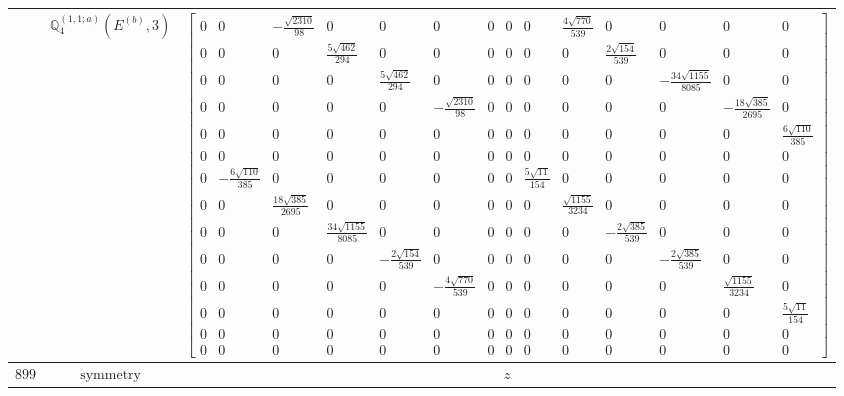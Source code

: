 \documentclass[fleqn,8pt,landscape]{jsarticle}
\begin{document}
\begin{longtable}{ccc}
$  $ & $ \mathbb{Q}_{4}^{(1,1;a)}(E^{(b)},3) $ & $ \begin{bmatrix} 0 & 0 & - \frac{\sqrt{2310}}{98} & 0 & 0 & 0 & 0 & 0 & 0 & \frac{4 \sqrt{770}}{539} & 0 & 0 & 0 & 0 \\ 0 & 0 & 0 & \frac{5 \sqrt{462}}{294} & 0 & 0 & 0 & 0 & 0 & 0 & \frac{2 \sqrt{154}}{539} & 0 & 0 & 0 \\ 0 & 0 & 0 & 0 & \frac{5 \sqrt{462}}{294} & 0 & 0 & 0 & 0 & 0 & 0 & - \frac{34 \sqrt{1155}}{8085} & 0 & 0 \\ 0 & 0 & 0 & 0 & 0 & - \frac{\sqrt{2310}}{98} & 0 & 0 & 0 & 0 & 0 & 0 & - \frac{18 \sqrt{385}}{2695} & 0 \\ 0 & 0 & 0 & 0 & 0 & 0 & 0 & 0 & 0 & 0 & 0 & 0 & 0 & \frac{6 \sqrt{110}}{385} \\ 0 & 0 & 0 & 0 & 0 & 0 & 0 & 0 & 0 & 0 & 0 & 0 & 0 & 0 \\ 0 & - \frac{6 \sqrt{110}}{385} & 0 & 0 & 0 & 0 & 0 & 0 & \frac{5 \sqrt{11}}{154} & 0 & 0 & 0 & 0 & 0 \\ 0 & 0 & \frac{18 \sqrt{385}}{2695} & 0 & 0 & 0 & 0 & 0 & 0 & \frac{\sqrt{1155}}{3234} & 0 & 0 & 0 & 0 \\ 0 & 0 & 0 & \frac{34 \sqrt{1155}}{8085} & 0 & 0 & 0 & 0 & 0 & 0 & - \frac{2 \sqrt{385}}{539} & 0 & 0 & 0 \\ 0 & 0 & 0 & 0 & - \frac{2 \sqrt{154}}{539} & 0 & 0 & 0 & 0 & 0 & 0 & - \frac{2 \sqrt{385}}{539} & 0 & 0 \\ 0 & 0 & 0 & 0 & 0 & - \frac{4 \sqrt{770}}{539} & 0 & 0 & 0 & 0 & 0 & 0 & \frac{\sqrt{1155}}{3234} & 0 \\ 0 & 0 & 0 & 0 & 0 & 0 & 0 & 0 & 0 & 0 & 0 & 0 & 0 & \frac{5 \sqrt{11}}{154} \\ 0 & 0 & 0 & 0 & 0 & 0 & 0 & 0 & 0 & 0 & 0 & 0 & 0 & 0 \\ 0 & 0 & 0 & 0 & 0 & 0 & 0 & 0 & 0 & 0 & 0 & 0 & 0 & 0 \end{bmatrix} $ \\ \hline
$ 899 $ & $ \text{symmetry} $ & $ z $ \\

\end{longtable}
\end{document}

